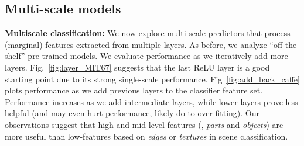 \documentclass[10pt,twocolumn,letterpaper]{article}
\begin{document}
\subsection{Multi-scale models} 

{\bf Multiscale classification:} We now explore multi-scale predictors that process (marginal) features extracted from multiple layers. As before, we analyze ``off-the-shelf'' pre-trained models. We evaluate performance as we iteratively add more layers. Fig.~\ref{fig:layer_MIT67} suggests that the last ReLU layer is a good starting point due to its strong single-scale performance. Fig~\ref{fig:add_back_caffe} plots performance as we add previous layers to the classifier feature set. Performance increases as we add intermediate layers, while lower layers prove less helpful (and may even hurt performance, likely do to over-fitting). Our observations suggest that high and mid-level features (\ie, \textit{parts} and \textit{objects}) are more useful than low-features based on \textit{edges} or \textit{textures} in scene classification. 




\end{document}
